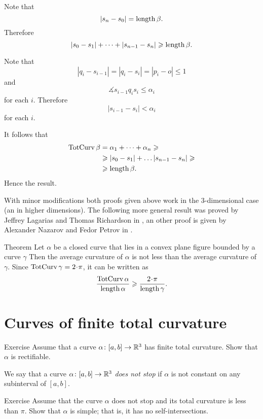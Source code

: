 Note that 
\[|s_n-s_0|=\mathop{\rm length}\nolimits \beta.\]
Therefore 
\[|s_0-s_1|+\dots+|s_{n-1}-s_n|\geqslant \mathop{\rm length}\nolimits \beta.\]

Note that 
\[|q_i-s_{i-1}|=|q_i-s_i|=|p_i-o|\le 1\]
and
\[\measuredangle s_{i-1}q_is_i\le \alpha_i\]
for each $i$.
Therefore 
\[|s_{i-1}-s_i|<\alpha_i\]
for each $i$.

It follows that
\begin{align*}
\mathop{\rm TotCurv}\nolimits \beta
&=\alpha_1+\dots+\alpha_n\geqslant
\\
&\geqslant |s_{0}-s_1|+\dots |s_{n-1}-s_n|\geqslant 
\\
&\geqslant\mathop{\rm length}\nolimits \beta.
\end{align*}
Hence the result.
\qeds

With minor modifications both proofs given above work in the 3-dimensional case (an in higher dimensions).
The following more general result was proved by Jeffrey Lagarias and Thomas Richardson in \cite{lagarias-richardso}, an other proof is given by Alexander Nazarov and Fedor Petrov in \cite{nazarov-petrov}.

\begin{thm}{Theorem}
Let $\alpha$ be a closed curve that lies in a convex plane figure bounded by a curve $\gamma$
Then the average curvature of $\alpha$ is not less than the average curvature of $\gamma$.
Since  $\tc\gamma=2\cdot\pi$, it can be written as
\[\frac{\tc\alpha}{\length\alpha}\ge \frac{2\cdot\pi}{\length\gamma}.\]

\end{thm}



\section{Curves of finite total curvature}

\begin{thm}{Exercise} 
Assume that a curve $\alpha\colon[a,b]\to\mathbb{R}^3$ has finite total curvature.
 Show that $\alpha$ is rectifiable.
\end{thm}

We say that a curve $\alpha\colon[a,b]\to\mathbb{R}^3$ \emph{does not stop} if $\alpha$ is not constant on any subinterval of $[a,b]$. 

\begin{thm}{Exercise} 
Assume that the curve $\alpha$ does not stop and its total curvature is less than $\pi$.
Show that $\alpha$ is simple; that is, it has no self-intersections.
\end{thm}

